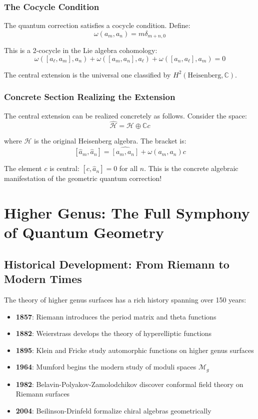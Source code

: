 \subsubsection{The Cocycle Condition}

The quantum correction satisfies a cocycle condition. Define:
$$\omega(a_m, a_n) = m\delta_{m+n,0}$$

This is a 2-cocycle in the Lie algebra cohomology:
$$\omega([a_\ell, a_m], a_n) + \omega([a_m, a_n], a_\ell) + \omega([a_n, a_\ell], a_m) = 0$$

The central extension is the universal one classified by $H^2(\text{Heisenberg}, \mathbb{C})$.

\subsubsection{Concrete Section Realizing the Extension}

The central extension can be realized concretely as follows. Consider the space:
$$\hat{\mathcal{H}} = \mathcal{H} \oplus \mathbb{C} c$$

where $\mathcal{H}$ is the original Heisenberg algebra. The bracket is:
$$[\hat{a}_m, \hat{a}_n] = \widehat{[a_m, a_n]} + \omega(a_m, a_n) c$$

The element $c$ is central: $[c, \hat{a}_n] = 0$ for all $n$. This is the concrete algebraic manifestation of the geometric quantum correction!

\section{Higher Genus: The Full Symphony of Quantum Geometry}

\subsection{Historical Development: From Riemann to Modern Times}

The theory of higher genus surfaces has a rich history spanning over 150 years:

\begin{itemize}
\item \textbf{1857}: Riemann introduces the period matrix and theta functions
\item \textbf{1882}: Weierstrass develops the theory of hyperelliptic functions
\item \textbf{1895}: Klein and Fricke study automorphic functions on higher genus surfaces
\item \textbf{1964}: Mumford begins the modern study of moduli spaces $\mathcal{M}_g$
\item \textbf{1982}: Belavin-Polyakov-Zamolodchikov discover conformal field theory on Riemann surfaces
\item \textbf{2004}: Beilinson-Drinfeld formalize chiral algebras geometrically
\end{itemize}

